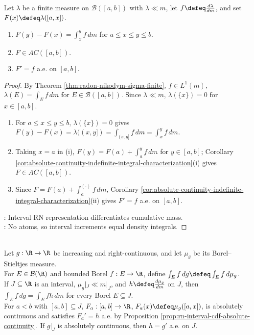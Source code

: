 \begin{proposition} \label{prop:rn-interval-cdf-absolute-continuity} \\
Let $\lambda$ be a finite measure on $\mathcal{B}([a,b])$ with $\lambda\ll m$, let $f\defeq\frac{d\lambda}{dm}$, and set $F(x)\defeq\lambda([a,x])$.
\begin{enumerate}[label=(\roman*)]
\setlength{\itemsep}{0pt}
\item $F(y)-F(x)=\int_x^yf\,dm$ for $a\leq x\leq y\leq b$.
\item $F\in AC([a,b])$.
\item $F'=f$ a.e. on $[a,b]$.
\end{enumerate}
\begin{proof} By Theorem \ref{thm:radon-nikodym-sigma-finite}, $f\in L^1(m)$, $\lambda(E)=\int_Ef\,dm$ for $E\in\mathcal{B}([a,b])$. Since $\lambda\ll m$, $\lambda(\{x\})=0$ for $x\in[a,b]$.
\begin{enumerate}[label=(\roman*)]
\setlength{\itemsep}{0pt}
\item For $a\leq x\leq y\leq b$, $\lambda(\{x\})=0$ gives $F(y)-F(x)=\lambda((x,y])=\int_{(x,y]}f\,dm=\int_x^yf\,dm$.
\item Taking $x=a$ in (i), $F(y)=F(a)+\int_a^yf\,dm$ for $y\in[a,b]$; Corollary \ref{cor:absolute-continuity-indefinite-integral-characterization}(i) gives $F\in AC([a,b])$.
\item Since $F=F(a)+\int_a^{(\cdot)}f\,dm$, Corollary \ref{cor:absolute-continuity-indefinite-integral-characterization}(ii) gives $F'=f$ a.e. on $[a,b]$.
\end{enumerate}
: Interval RN representation differentiates cumulative mass.\\
: No atoms, so interval increments equal density integrals.
\end{proof}
\end{proposition}

\begin{remark} \label{rem:lebesgue-stieltjes-integrals-from-generated-measures} \\
Let $g:\R\to\R$ be increasing and right-continuous, and let $\mu_g$ be its Borel--Stieltjes measure.\\
For $E\in\mathcal{B}(\R)$ and bounded Borel $f:E\to\R$, define $\int_E f\,dg\defeq\int_E f\,d\mu_g$.\\
If $J\subseteq\R$ is an interval, $\mu_g|_J\ll m|_J$, and $h\defeq\frac{d\mu_g}{dm}$ on $J$, then $\int_E f\,dg=\int_E fh\,dm$ for every Borel $E\subseteq J$.\\
For $a<b$ with $[a,b]\subseteq J$, $F_a:[a,b]\to\R$, $F_a(x)\defeq\mu_g([a,x])$, is absolutely continuous and satisfies $F_a'=h$ a.e. by Proposition \ref{prop:rn-interval-cdf-absolute-continuity}. If $g|_J$ is absolutely continuous, then $h=g'$ a.e. on $J$.
\end{remark}


